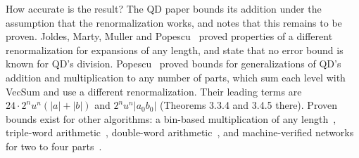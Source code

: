 \documentclass[conference]{IEEEtran}
\theoremstyle{definition}
\theoremstyle{remark}
\begin{document}
How accurate is the result? The QD paper bounds its addition under the assumption that the renormalization works, and
notes that this remains to be proven. Joldes, Marty, Muller and Popescu~\cite{JMMP16} proved properties of a different
renormalization for expansions of any length, and state that no error bound is known for QD's division.
Popescu~\cite{Popescu17} proved bounds for generalizations of QD's addition and multiplication to any number of parts,
which sum each level with VecSum and use a different renormalization. Their leading terms are $24 \cdot 2^n u^n(|a| +
|b|)$ and $2^n u^n |a_0b_0|$ (Theorems 3.3.4 and 3.4.5 there). Proven bounds exist for other algorithms: a bin-based multiplication of any length~\cite{MPT16}, triple-word
arithmetic~\cite{FMP19}, double-word arithmetic~\cite{JMP17}, and machine-verified networks for two to four
parts~\cite{Zhang25}.
\end{document}
